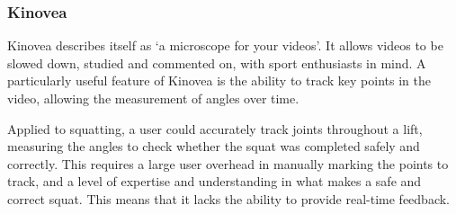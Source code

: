 \subsubsection{Kinovea}

Kinovea\cite{kinovea} describes itself as `a microscope for your videos'. It allows videos to be slowed down, studied and commented on, with sport enthusiasts in mind. A particularly useful feature of Kinovea is the ability to track key points in the video, allowing the measurement of angles over time. 

Applied to squatting, a user could accurately track joints throughout a lift, measuring the angles to check whether the squat was completed safely and correctly. This requires a large user overhead in manually marking the points to track, and a level of expertise and understanding in what makes a safe and correct squat. This means that it lacks the ability to provide real-time feedback.